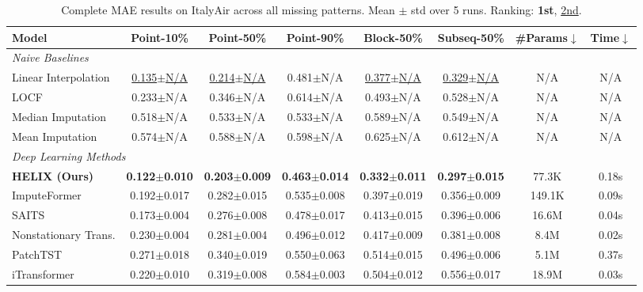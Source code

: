 \begin{table}[h]
    \caption{Complete MAE results on ItalyAir across all missing patterns. Mean $\pm$ std over 5 runs. Ranking: \textbf{1st}, \underline{2nd}.}
    \label{tab:full_italyair}
    \centering
    \begin{footnotesize}
    \begin{tabular}{l|ccccc|cc}
        \toprule
        \textbf{Model} & \textbf{Point-10\%} & \textbf{Point-50\%} & \textbf{Point-90\%} & \textbf{Block-50\%} & \textbf{Subseq-50\%} & \textbf{\#Params}$\downarrow$ & \textbf{Time}$\downarrow$ \\
        \midrule
        \multicolumn{8}{l}{\textit{Naive Baselines}} \\
        Linear Interpolation & \underline{0.135$\pm$N/A} & \underline{0.214$\pm$N/A} & 0.481$\pm$N/A & \underline{0.377$\pm$N/A} & \underline{0.329$\pm$N/A} & N/A & N/A \\
        LOCF & 0.233$\pm$N/A & 0.346$\pm$N/A & 0.614$\pm$N/A & 0.493$\pm$N/A & 0.528$\pm$N/A & N/A & N/A \\
        Median Imputation & 0.518$\pm$N/A & 0.533$\pm$N/A & 0.533$\pm$N/A & 0.589$\pm$N/A & 0.549$\pm$N/A & N/A & N/A \\
        Mean Imputation & 0.574$\pm$N/A & 0.588$\pm$N/A & 0.598$\pm$N/A & 0.625$\pm$N/A & 0.612$\pm$N/A & N/A & N/A \\
        \midrule
        \multicolumn{8}{l}{\textit{Deep Learning Methods}} \\
        \textbf{HELIX (Ours)} & \textbf{0.122$\pm$0.010} & \textbf{0.203$\pm$0.009} & \textbf{0.463$\pm$0.014} & \textbf{0.332$\pm$0.011} & \textbf{0.297$\pm$0.015} & 77.3K & 0.18s \\
        ImputeFormer & 0.192$\pm$0.017 & 0.282$\pm$0.015 & 0.535$\pm$0.008 & 0.397$\pm$0.019 & 0.356$\pm$0.009 & 149.1K & 0.09s \\
        SAITS & 0.173$\pm$0.004 & 0.276$\pm$0.008 & 0.478$\pm$0.017 & 0.413$\pm$0.015 & 0.396$\pm$0.006 & 16.6M & 0.04s \\
        Nonstationary Trans. & 0.230$\pm$0.004 & 0.281$\pm$0.004 & 0.496$\pm$0.012 & 0.417$\pm$0.009 & 0.381$\pm$0.008 & 8.4M & 0.02s \\
        PatchTST & 0.271$\pm$0.018 & 0.340$\pm$0.019 & 0.550$\pm$0.063 & 0.514$\pm$0.015 & 0.496$\pm$0.006 & 5.1M & 0.37s \\
        iTransformer & 0.220$\pm$0.010 & 0.319$\pm$0.008 & 0.584$\pm$0.003 & 0.504$\pm$0.012 & 0.556$\pm$0.017 & 18.9M & 0.03s \\

\end{tabular}
\end{footnotesize}
\end{table}
